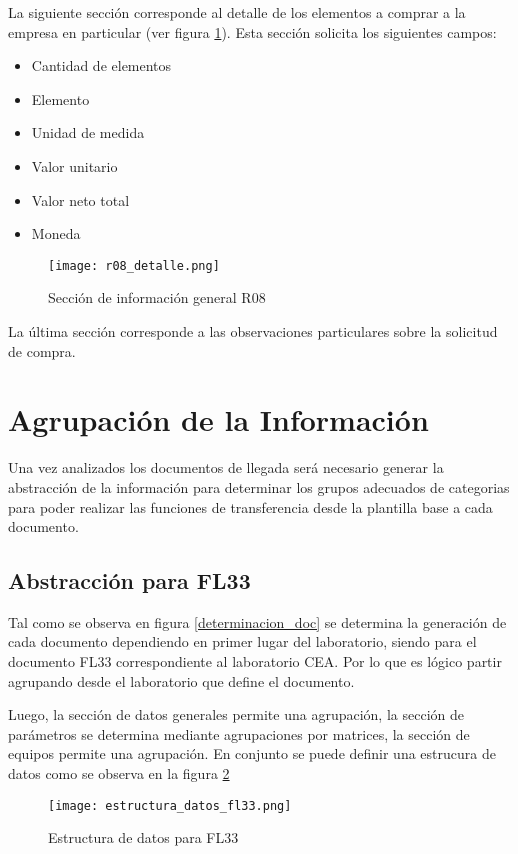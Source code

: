 La siguiente sección corresponde al detalle de los elementos a comprar a la empresa en particular (ver figura \ref{detalle_r08}). Esta sección solicita los siguientes campos:

\begin{itemize}
	\item Cantidad de elementos
	\item Elemento
	\item Unidad de medida
	\item Valor unitario
	\item Valor neto total
	\item Moneda
\end{itemize}

\begin{figure}
	\centering
	\texttt{[image: r08\_detalle.png]}
	\caption{Sección de información general R08}
	\label{detalle_r08}
\end{figure}

La última sección corresponde a las observaciones particulares sobre la solicitud de compra.

\section*{Agrupación de la Información}

Una vez analizados los documentos de llegada será necesario generar la abstracción de la información para determinar los grupos adecuados de categorias para poder realizar las funciones de transferencia desde la plantilla base a cada documento. 

\subsection{Abstracción para FL33}

Tal como se observa en figura \ref{determinacion_doc} se determina la generación de cada documento dependiendo en primer lugar del laboratorio, siendo para el documento FL33 correspondiente al laboratorio CEA. Por lo que es lógico partir agrupando desde el laboratorio que define el documento.

Luego, la sección de datos generales permite una agrupación, la sección de parámetros se determina mediante agrupaciones por matrices, la sección de equipos permite una agrupación.
En conjunto se puede definir una estrucura de datos como se observa en la figura \ref{estructura_datos_fl33}

\begin{figure}
	\centering
	\texttt{[image: estructura\_datos\_fl33.png]}
	\caption{Estructura de datos para FL33}
	\label{estructura_datos_fl33}
\end{figure}


